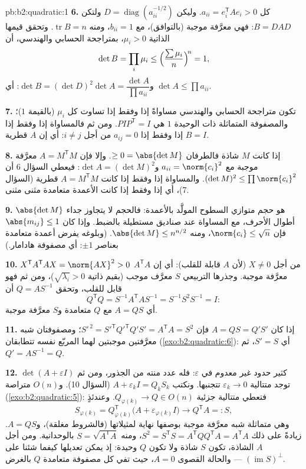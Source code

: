 \begin{solution}{pb:b2:quadratic:1}
\textbf{6.} كل $a_{ii} = e_i^{\mathsf T}Ae_i > 0$. وليكن $D =
\operatorname{diag}(a_{ii}^{-1/2})$ ولتكن $B = DAD$: فهي معرَّفة
موجبة (بالتوافق)، مع $b_{ii} = 1$، ومنه $\operatorname{tr}
B = n$. وتحقق قيمها الذاتية $\mu_i > 0$، بمتراجحة الحسابي والهندسي، أن
\[
\det B = \prod_i\mu_i
\leq \Bigl(\frac{\sum\mu_i}{n}\Bigr)^{\!n} = 1 ,
\]
و$\det B = (\det D)^2\det A = \dfrac{\det A}{\prod
a_{ii}}$: أي $\det A \leq \prod a_{ii}$.

\textbf{7.} تكون متراجحة الحسابي والهندسي مساواةً إذا وفقط إذا تساوت كل $\mu_i$
(بالقيمة $1$)؛ والمصفوفة المتماثلة ذات  الوحيدة $1$ هي
$PIP^{\mathsf T} = I$. ومن ثم فالمساواة إذا وفقط إذا $B = I$ إذا وفقط إذا $a_{ij} = 0$
من أجل $i \neq j$: أي إن $A$ قطرية.

\textbf{8.} إذا كانت $M$ شاذة فالطرفان $\geq 0 =
\abs{\det M}$. وإلا فإن $A = M^{\mathsf T}M$ معرَّفة
موجبة مع $a_{ii} = \norm{c_i}^2$ و$\det A = (\det
M)^2$: فيعطي السؤال 6 أن $(\det M)^2 \leq \prod\norm{c_i}^2$.
والمساواة إذا وفقط إذا كانت $A = M^{\mathsf T}M$ قطرية (السؤال 7)،
أي إذا وفقط إذا كانت الأعمدة متعامدة مثنى مثنى.

\textbf{9.} $\abs{\det M}$ هو حجم متوازي السطوح
المولَّد بالأعمدة: فالحجم لا يتجاوز جداء
أطوال الأحرف، مع المساواة عند صناديق مستطيلة بالضبط.
وإذا كان $\abs{m_{ij}} \leq 1$ فإن $\norm{c_i} \leq \sqrt n$، ومنه
$\abs{\det M} \leq n^{n/2}$. (وبلوغه يفرض أعمدة متعامدة
بعناصر $\pm1$: أي مصفوفة هادامار.)

\textbf{10.} $X^{\mathsf T}A^{\mathsf T}AX = \norm{AX}^2 > 0$
من أجل $X \neq 0$ (لأن $A$ قابلة للقلب): أي إن $A^{\mathsf T}A$ معرَّفة
موجبة. وجذرها التربيعي $S$ معرَّف موجب (بقيم ذاتية
$\sqrt{\lambda_i} > 0$)، ومن ثم فهو قابل للقلب، وتحقق $Q = AS^{-1}$
أن
\[
Q^{\mathsf T}Q = S^{-1}A^{\mathsf T}AS^{-1}
= S^{-1}S^2S^{-1} = I :
\]
أي $A = QS$ مع $Q$ متعامدة و$S$ معرَّفة موجبة.

\textbf{11.} إذا كان $A = QS = Q'S'$ فإن $S'^{\,2} =
S'^{\mathsf T}Q'^{\mathsf T}Q'S' = A^{\mathsf T}A = S^2$؛ ومصفوفتان
شبه معرَّفتين موجبتين لهما المربّع نفسه تتطابقان
(\cref{exo:b2:quadratic:6}): أي $S' = S$، ثم $Q' = AS^{-1} =
Q$.

\textbf{12.} $\det(A + \varepsilon I)$ كثير حدود غير معدوم
في $\varepsilon$: فله عدد منته من الجذور، ومن ثم توجد متتالية
$\varepsilon_k \to 0$ تتجنبها. ونكتب $A + \varepsilon_kI =
Q_kS_k$ (السؤال 10). و$O(n)$ متراصة
(\cref{exo:b2:quadratic:5}): فتعطي متتالية جزئية $Q_{\varphi(k)}
\to Q \in O(n)$. وعندئذٍ
\[
S_{\varphi(k)} = Q_{\varphi(k)}^{\mathsf T}
\bigl(A + \varepsilon_{\varphi(k)}I\bigr)
\longrightarrow Q^{\mathsf T}A =: S,
\]
وهي متماثلة شبه معرَّفة موجبة بوصفها نهاية لمثيلاتها (فالشروط
مغلقة)، و$A = QS$. زيادةً على ذلك $S^2 = S^{\mathsf T}S =
A^{\mathsf T}QQ^{\mathsf T}A = A^{\mathsf T}A$، ومنه $S =
\sqrt{A^{\mathsf T}A}$ بالوحدانية. ومن أجل $A$ الشاذة، تكون $S$
شاذة ولا تكون $Q$ وحيدة: إذ يمكن تعديلها كيفما شئنا
على $(\operatorname{im} S)^{\perp}$ --- والحالة القصوى $A = 0$،
حيث تفي كل مصفوفة متعامدة $Q$ بالغرض.


\end{solution}
